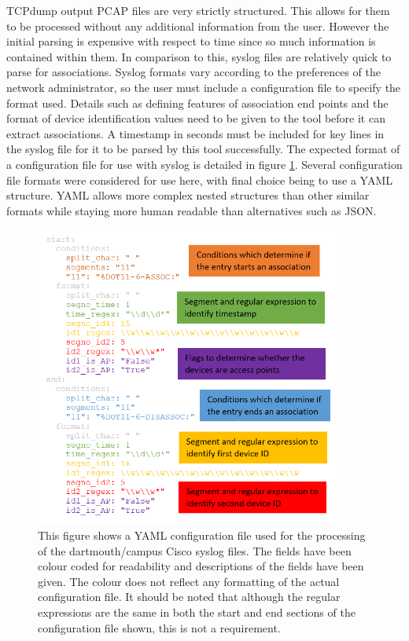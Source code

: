 TCPdump output PCAP files are very strictly structured. This allows for them to be processed without any additional information from the user. However the initial parsing is expensive with respect to time since so much information is contained within them. In comparison to this, syslog files are relatively quick to parse for associations. Syslog formats vary according to the preferences of the network administrator, so the user must include a configuration file to specify the format used. Details such as defining features of association end points and the format of device identification values need to be given to the tool before it can extract associations. A timestamp in seconds must be included for key lines in the syslog file for it to be parsed by this tool successfully. The expected format of a configuration file for use with syslog is detailed in figure \ref{fig:JSON_config}. Several configuration file formats were considered for use here, with final choice being to use a YAML structure. YAML allows more complex nested structures than other similar formats while staying more human readable than alternatives such as JSON.

\begin{figure}[h]
    \centering
    \includegraphics[width=0.9\textwidth]{conf.png}
    \caption{This figure shows a YAML configuration file used for the processing of the dartmouth/campus Cisco syslog files. The fields have been colour coded for readability and descriptions of the fields have been given. The colour does not reflect any formatting of the actual configuration file. It should be noted that although the regular expressions are the same in both the start and end sections of the configuration file shown, this is not a requirement.}
    \label{fig:JSON_config}
\end{figure}

